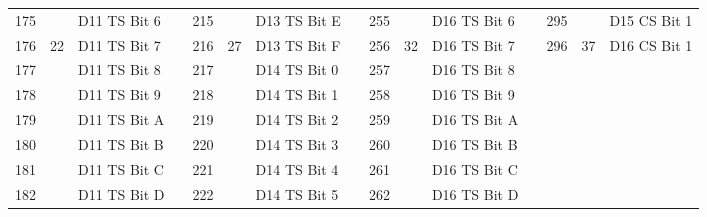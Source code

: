 \documentclass[]{article}
\begin{document}
\begin{landscape}
\begin{table}[]
\begin{tabular}{lllllllllllllll}
			175          &                      & D11 TS Bit 6      &                    & 215          &                      & D13 TS Bit E      &  & 255          &                      & D16 TS Bit 6      &  & 295                      &                                            & D15 CS Bit 1             \\
			176          & \multirow{-8}{*}{22} & D11 TS Bit 7      &                    & 216          & \multirow{-8}{*}{27} & D13 TS Bit F      &  & 256          & \multirow{-8}{*}{32} & D16 TS Bit 7      &  & 296                      & \multirow{-8}{*}{37}                       & D16 CS Bit 1             \\ \cline{1-3} \cline{5-7} \cline{9-11} \cline{13-15} 
			177          &                      & D11 TS Bit 8      &                    & 217          &                      & D14 TS Bit 0      &  & 257          &                      & D16 TS Bit 8      &  & \cellcolor[HTML]{EFEFEF} & \cellcolor[HTML]{EFEFEF}                   & \cellcolor[HTML]{EFEFEF} \\
			178          &                      & D11 TS Bit 9      &                    & 218          &                      & D14 TS Bit 1      &  & 258          &                      & D16 TS Bit 9      &  & \cellcolor[HTML]{EFEFEF} & \cellcolor[HTML]{EFEFEF}                   & \cellcolor[HTML]{EFEFEF} \\
			179          &                      & D11 TS Bit A      &                    & 219          &                      & D14 TS Bit 2      &  & 259          &                      & D16 TS Bit A      &  & \cellcolor[HTML]{EFEFEF} & \cellcolor[HTML]{EFEFEF}                   & \cellcolor[HTML]{EFEFEF} \\
			180          &                      & D11 TS Bit B      &                    & 220          &                      & D14 TS Bit 3      &  & 260          &                      & D16 TS Bit B      &  & \cellcolor[HTML]{EFEFEF} & \cellcolor[HTML]{EFEFEF}                   & \cellcolor[HTML]{EFEFEF} \\
			181          &                      & D11 TS Bit C      &                    & 221          &                      & D14 TS Bit 4      &  & 261          &                      & D16 TS Bit C      &  & \cellcolor[HTML]{EFEFEF} & \cellcolor[HTML]{EFEFEF}                   & \cellcolor[HTML]{EFEFEF} \\
			182          &                      & D11 TS Bit D      &                    & 222          &                      & D14 TS Bit 5      &  & 262          &                      & D16 TS Bit D      &  & \cellcolor[HTML]{EFEFEF} & \cellcolor[HTML]{EFEFEF}                   & \cellcolor[HTML]{EFEFEF} \\

\end{tabular}
\end{table}
\end{landscape}
\end{document}
